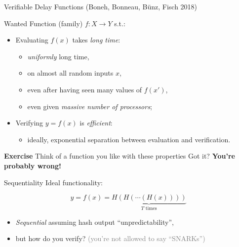 \documentclass[aspectratio=169]{beamer}
\begin{document}

\begin{frame}{Verifiable Delay Functions (Boneh, Bonneau, Bünz, Fisch 2018)}
  \begin{block}{Wanted}
    Function (family) \emph{$f:X\to Y$} s.t.:

    \begin{itemize}
    \item Evaluating $f(x)$ takes \emph{long time}:
      \begin{itemize}
      \item \emph{uniformly} long time,
      \item on almost all random inputs $x$,
      \item even after having seen many values of $f(x')$,
      \item even given \emph{massive number of processors};
      \end{itemize}
    \item Verifying $y=f(x)$ is \emph{efficient}:
      \begin{itemize}
      \item ideally, exponential separation between evaluation and
        verification.
      \end{itemize}
    \end{itemize}
  \end{block}

  \centering
  \pause\vfill
  \textbf{Exercise}
  \pause\vfill
  Think of a function you like with these properties
  \pause\vfill
  Got it?
  \pause\vfill
  \textbf{You're probably wrong!}
\end{frame}


\begin{frame}{Sequentiality}
  Ideal functionality:

  \[y = f(x) = \underbrace{H(H(\cdots(H(x))))}_{T \text{ times}}\]

  \begin{itemize}
  \item \emph{Sequential} assuming hash output ``unpredictability'',
  \item but how do you verify? \textcolor{gray}{(you're not allowed to say ``SNARKs'')}
  \end{itemize}
\end{frame}

\end{document}
